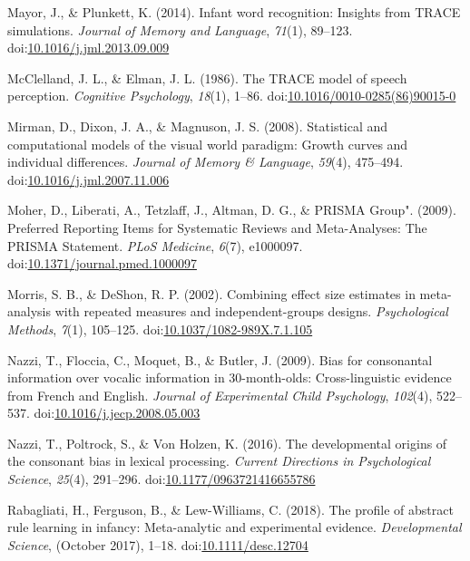 \documentclass[
  man, noextraspace]{apa6}
\begin{document}
\leavevmode\hypertarget{ref-Mayor2014}{}%
Mayor, J., \& Plunkett, K. (2014). Infant word recognition: Insights from TRACE simulations. \emph{Journal of Memory and Language}, \emph{71}(1), 89--123. doi:\href{https://doi.org/10.1016/j.jml.2013.09.009}{10.1016/j.jml.2013.09.009}

\leavevmode\hypertarget{ref-McClelland1986}{}%
McClelland, J. L., \& Elman, J. L. (1986). The TRACE model of speech perception. \emph{Cognitive Psychology}, \emph{18}(1), 1--86. doi:\href{https://doi.org/10.1016/0010-0285(86)90015-0}{10.1016/0010-0285(86)90015-0}

\leavevmode\hypertarget{ref-Mirman2008}{}%
Mirman, D., Dixon, J. A., \& Magnuson, J. S. (2008). Statistical and computational models of the visual world paradigm: Growth curves and individual differences. \emph{Journal of Memory \& Language}, \emph{59}(4), 475--494. doi:\href{https://doi.org/10.1016/j.jml.2007.11.006}{10.1016/j.jml.2007.11.006}

\leavevmode\hypertarget{ref-Moher2009}{}%
Moher, D., Liberati, A., Tetzlaff, J., Altman, D. G., \& PRISMA Group". (2009). Preferred Reporting Items for Systematic Reviews and Meta-Analyses: The PRISMA Statement. \emph{PLoS Medicine}, \emph{6}(7), e1000097. doi:\href{https://doi.org/10.1371/journal.pmed.1000097}{10.1371/journal.pmed.1000097}

\leavevmode\hypertarget{ref-morris2002combining}{}%
Morris, S. B., \& DeShon, R. P. (2002). Combining effect size estimates in meta-analysis with repeated measures and independent-groups designs. \emph{Psychological Methods}, \emph{7}(1), 105--125. doi:\href{https://doi.org/10.1037/1082-989X.7.1.105}{10.1037/1082-989X.7.1.105}

\leavevmode\hypertarget{ref-Nazzi2009a}{}%
Nazzi, T., Floccia, C., Moquet, B., \& Butler, J. (2009). Bias for consonantal information over vocalic information in 30-month-olds: Cross-linguistic evidence from French and English. \emph{Journal of Experimental Child Psychology}, \emph{102}(4), 522--537. doi:\href{https://doi.org/10.1016/j.jecp.2008.05.003}{10.1016/j.jecp.2008.05.003}

\leavevmode\hypertarget{ref-Nazzi2016}{}%
Nazzi, T., Poltrock, S., \& Von Holzen, K. (2016). The developmental origins of the consonant bias in lexical processing. \emph{Current Directions in Psychological Science}, \emph{25}(4), 291--296. doi:\href{https://doi.org/10.1177/0963721416655786}{10.1177/0963721416655786}

\leavevmode\hypertarget{ref-Rabagliati2018}{}%
Rabagliati, H., Ferguson, B., \& Lew-Williams, C. (2018). The profile of abstract rule learning in infancy: Meta-analytic and experimental evidence. \emph{Developmental Science}, (October 2017), 1--18. doi:\href{https://doi.org/10.1111/desc.12704}{10.1111/desc.12704}
\end{document}
